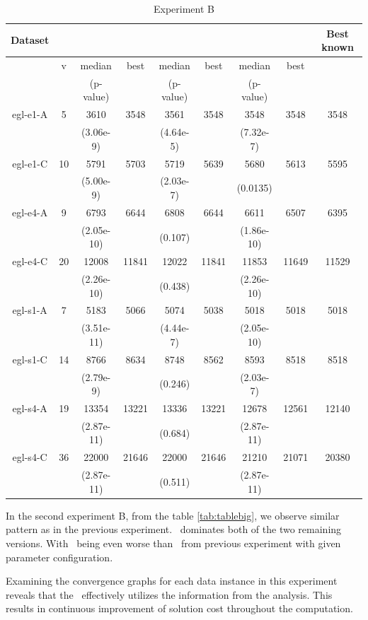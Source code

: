 \documentclass[twoside]{ctuthesis}
\theoremstyle{plain}
\theoremstyle{definition}
\theoremstyle{note}
\begin{document}
\begin{table}[htbp]
	\centering
	\caption{Experiment B}
	\label{tab:tableb}
	\begin{tabular}{|c|c|cc|cc|cc|c|}
		\hline
		\textbf{Dataset}&&\multicolumn{2}{c|}{\textbf{\nnsrbasic20}}&\multicolumn{2}{c|}{\textbf{\nnsrnode20}}&\multicolumn{2}{c|}{\textbf{\nnsredge}}&\textbf{Best known} \\ \hline
		&v&median&best&median&best&median&best&\\
		&&(p-value)&&(p-value)&&(p-value)&&\\
		\hline
		egl-e1-A &5&3610&3548&3561&3548&3548&3548&3548\\
		&&(3.06e-9)&& (4.64e-5)&& (7.32e-7)&&\\ \hline
		egl-e1-C &10&5791&5703&5719&5639&5680&5613&5595\\
		&&(5.00e-9)&& (2.03e-7)&& (0.0135)&&\\ \hline
		egl-e4-A &9&6793&6644&6808&6644&6611&6507&6395\\
		&&(2.05e-10)&& (0.107)&& (1.86e-10)&&\\ \hline
		egl-e4-C &20&12008&11841&12022&11841&11853&11649&11529\\
		&&(2.26e-10)&& (0.438)&& (2.26e-10)&&\\ \hline
		egl-s1-A &7&5183&5066&5074&5038&5018&5018&5018\\
		&&(3.51e-11)&& (4.44e-7)&& (2.05e-10)&&\\ \hline
		egl-s1-C &14&8766&8634&8748&8562&8593&8518&8518\\
		&&(2.79e-9)&& (0.246)&& (2.03e-7)&&\\ \hline
		egl-s4-A &19&13354&13221&13336&13221&12678&12561&12140\\
		&&(2.87e-11)&& (0.684)&& (2.87e-11)&&\\ \hline
		egl-s4-C &36&22000&21646&22000&21646&21210&21071&20380\\
		&&(2.87e-11)&& (0.511)&& (2.87e-11)&&\\ \hline
	\end{tabular}
\end{table}

In the second experiment B, from the table \ref{tab:tablebig}, we observe similar pattern as in the previous experiment. \nnsredge\ dominates both of the two remaining versions. With \nnsrbasic\ being even worse than \nnsrvanilla\ from previous experiment with given parameter configuration.

Examining the convergence graphs for each data instance in this experiment reveals that the \nnsredge\ effectively utilizes the information from the analysis. This results in continuous improvement of solution cost throughout the computation.
\end{document}
